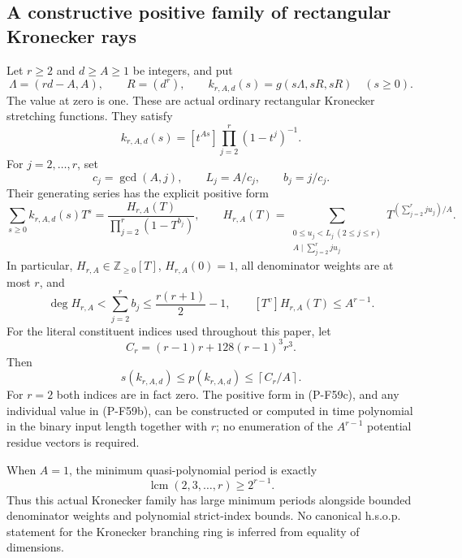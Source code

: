 \subsection{A constructive positive family of rectangular Kronecker rays}

\begin{proposition}
\label{prop:rectangularadjoint}
Let $r\ge2$ and $d\ge A\ge1$ be integers, and put
\[
 \Lambda=(rd-A,A),\qquad R=(d^r),\qquad
 k_{r,A,d}(s)=g(s\Lambda,sR,sR)\quad(s\ge0).
                                                               \tag{P-F59a}
\]
The value at zero is one. These are actual ordinary rectangular
Kronecker stretching functions. They satisfy
\[
 k_{r,A,d}(s)
       =[t^{As}]\prod_{j=2}^{r}(1-t^j)^{-1}.
                                                               \tag{P-F59b}
\]
For $j=2,\ldots,r$, set
\[
 c_j=\gcd(A,j),\qquad L_j=A/c_j,\qquad b_j=j/c_j.
\]
Their generating series has the explicit positive form
\[
 \sum_{s\ge0}k_{r,A,d}(s)T^s
   =\frac{H_{r,A}(T)}{\prod_{j=2}^{r}(1-T^{b_j})},
 \qquad
 H_{r,A}(T)=
 \sum_{\substack{0\le u_j<L_j\ (2\le j\le r)\\
                         A\mid\sum_{j=2}^{r}ju_j}}
       T^{(\sum_{j=2}^{r}ju_j)/A}.
                                                               \tag{P-F59c}
\]
In particular, $H_{r,A}\in\mathbb Z_{\ge0}[T]$, $H_{r,A}(0)=1$,
all denominator weights are at most $r$, and
\[
 \deg H_{r,A}<\sum_{j=2}^{r}b_j
                      \le\frac{r(r+1)}2-1,
 \qquad
 [T^v]H_{r,A}(T)\le A^{r-1}.
                                                               \tag{P-F59d}
\]
For the literal constituent indices used throughout this paper, let
\[
 C_r=(r-1)r+128(r-1)^3r^3.
\]
Then
\[
 s(k_{r,A,d})\le p(k_{r,A,d})
                       \le\left\lceil C_r/A\right\rceil.
                                                               \tag{P-F59e}
\]
For $r=2$ both indices are in fact zero.
The positive form in (P-F59c), and any individual value in
(P-F59b), can be constructed or computed in time polynomial in
the binary input length together with $r$; no enumeration of the
$A^{r-1}$ potential residue vectors is required.

When $A=1$, the minimum quasi-polynomial period is exactly
\[
       \operatorname{lcm}(2,3,\ldots,r)\ge2^{r-1}.
                                                               \tag{P-F59f}
\]
Thus this actual Kronecker family has large minimum periods
alongside bounded denominator weights and polynomial strict-index
bounds. No canonical h.s.o.p. statement for the Kronecker
branching ring is inferred from equality of dimensions.
\end{proposition}

